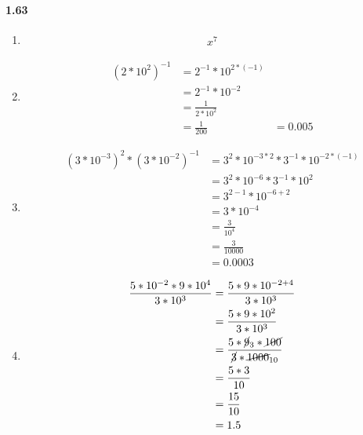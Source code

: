 \documentclass{article}
\newcommand\litem[1]{\item{\bfseries#1\space}}
\begin{document}
\paragraph{1.63}
\begin{enumerate}[label=\emph{\alph*})]
\litem{
\begin{align*}
  x^7
\end{align*}
}
\litem{
\begin{align*}
  \left(2 * 10^2\right)^{-1} &= 2^{-1} * 10^{2 * (-1)} \\
  &= 2^{-1} * 10^{-2} \\
  &= \frac{1}{2 * 10^2} \\ 
  &= \frac{1}{200}
  &= 0.005
\end{align*}
}
\litem{
\begin{align*}
  \left(3 * 10^{-3}\right)^2 * \left(3 * 10^{-2}\right)^{-1} &= 3^2 * 10^{-3 * 2} * 3^{-1} * 10^{-2 * (-1)} \\
  &= 3^2 * 10^{-6} * 3^{-1} * 10^2 \\
  &= 3^{2-1} * 10^{-6 + 2} \\
  &= 3 * 10^{-4} \\
  &= \frac{3}{10^4} \\
  &= \frac{3}{10000} \\
  &= 0.0003
\end{align*}
}
\litem{
\begin{align*}
  \frac{5 * 10^{-2} * 9 * 10^4}{3 * 10^3} &= \frac{5 * 9 * 10^{-2 + 4}}{3 * 10^3} \\
  &= \frac{5 * 9 * 10^{2}}{3 * 10^3} \\
  &= \frac{5 * \cancel{9}_3 * \cancel{100}}{\cancel{3} * \cancel{1000}_{10}} \\
  &= \frac{5 * 3}{10} \\ 
  &= \frac{15}{10} \\
  &= 1.5
\end{align*}
}
\end{enumerate}
\end{document}
